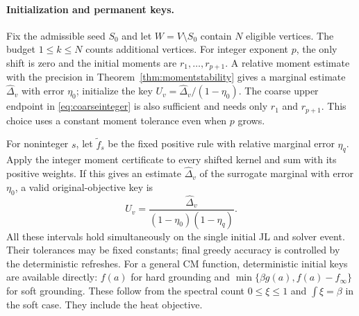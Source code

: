 \documentclass[11pt]{article}
\begin{document}
\paragraph{Initialization and permanent keys.}
Fix the admissible seed $S_0$ and let $W=V\setminus S_0$ contain
$N$ eligible vertices. The budget $1\leq k\leq N$ counts additional vertices.
For integer exponent $p$, the only shift is zero and the initial
moments are $r_1,\ldots,r_{p+1}$. A relative moment estimate with
the precision in Theorem~\ref{thm:momentstability} gives a marginal
estimate $\widehat\Delta_v$ with error $\eta_0$; initialize the key
$U_v=\widehat\Delta_v/(1-\eta_0)$. The coarse upper endpoint in
\eqref{eq:coarseinteger} is also sufficient and needs only $r_1$
and $r_{p+1}$. This choice uses a constant moment tolerance even
when $p$ grows.

For noninteger $s$, let $\widetilde f_s$ be the fixed positive rule
with relative marginal error $\eta_q$. Apply the integer moment
certificate to every shifted kernel and sum with its positive
weights. If this gives an estimate $\widehat\Delta_v$ of the
surrogate marginal with error $\eta_0$, a valid original-objective
key is
\[
 U_v=\frac{\widehat\Delta_v}{(1-\eta_0)(1-\eta_q)}.
\]
All these intervals hold simultaneously on the single initial JL
and solver event. Their tolerances may be fixed constants; final
greedy accuracy is controlled by the deterministic refreshes.
For a general CM function, deterministic initial keys are available
directly: $f(a)$ for hard grounding and
$\min\{\beta g(a),f(a)-f_\infty\}$ for soft grounding. These follow
from the spectral count $0\leq\xi\leq1$ and $\int\xi=\beta$
in the soft case. They include the heat objective.
\end{document}
